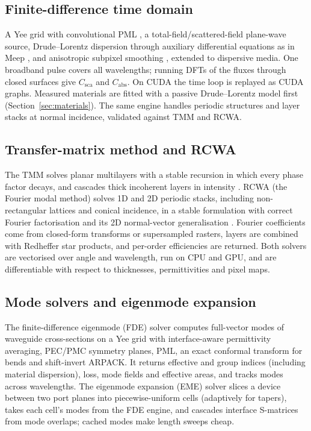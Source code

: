 \documentclass[11pt]{article}
\begin{document}
\subsection{Finite-difference time domain}
A Yee grid \cite{Yee1966} with convolutional PML \cite{Roden2000cpml}, a total-field/scattered-field
plane-wave source, Drude--Lorentz dispersion through auxiliary differential equations as in Meep
\cite{Oskooi2010meep}, and anisotropic subpixel smoothing \cite{Farjadpour2006}, extended to dispersive
media. One broadband pulse covers all wavelengths; running DFTs of the fluxes through closed surfaces
give $C_\mathrm{sca}$ and $C_\mathrm{abs}$. On CUDA the time loop is replayed as CUDA graphs. Measured
materials are fitted with a passive Drude--Lorentz model first (Section~\ref{sec:materials}). The
same engine handles periodic structures and layer stacks at normal incidence, validated against TMM and
RCWA.

\subsection{Transfer-matrix method and RCWA}
The TMM solves planar multilayers with a stable recursion in which every phase factor decays, and
cascades thick incoherent layers in intensity \cite{KatsidisSiapkas2002}. RCWA (the Fourier modal
method) solves 1D and 2D periodic stacks, including non-rectangular lattices and conical incidence,
in a stable formulation \cite{Moharam1995} with correct Fourier factorisation \cite{Li1996} and its
2D normal-vector generalisation \cite{Schuster2007}. Fourier coefficients come from closed-form
transforms or supersampled rasters, layers are combined with Redheffer star products, and per-order
efficiencies are returned. Both solvers are vectorised over angle and wavelength, run on CPU and GPU, and
are differentiable with respect to thicknesses, permittivities and pixel maps.

\subsection{Mode solvers and eigenmode expansion}
The finite-difference eigenmode (FDE) solver computes full-vector modes of waveguide cross-sections on
a Yee grid with interface-aware permittivity averaging, PEC/PMC symmetry planes, PML, an exact
conformal transform for bends and shift-invert ARPACK. It returns effective and group indices
(including material dispersion), loss, mode fields and effective areas, and tracks modes across
wavelengths. The eigenmode expansion (EME) solver slices a device between two port planes into
piecewise-uniform cells (adaptively for tapers), takes each cell's modes from the FDE engine, and
cascades interface S-matrices from mode overlaps; cached modes make length sweeps cheap.
\end{document}
